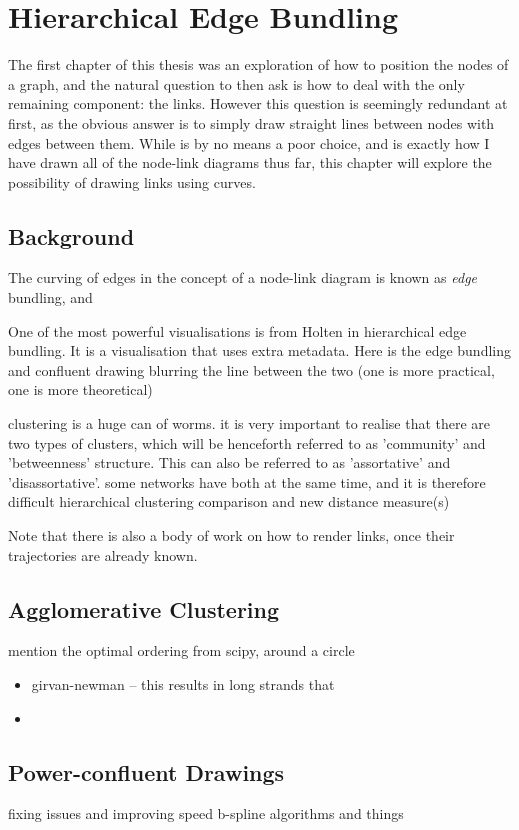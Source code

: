 \chapter{Hierarchical Edge Bundling}
The first chapter of this thesis was an exploration of how to position the nodes of a graph, and the natural question to then ask is how to deal with the only remaining component: the links. However this question is seemingly redundant at first, as the obvious answer is to simply draw straight lines between nodes with edges between them. While is by no means a poor choice, and is exactly how I have drawn all of the node-link diagrams thus far, this chapter will explore the possibility of drawing links using curves.

\section{Background}
The curving of edges in the concept of a node-link diagram is known as \textit{edge} bundling, and 

One of the most powerful visualisations is from Holten in hierarchical edge bundling. It is a visualisation that uses extra metadata. Here is the 
edge bundling and confluent drawing
blurring the line between the two (one is more practical, one is more theoretical)

clustering is a huge can of worms.
it is very important to realise that there are two types of clusters, which will be henceforth referred to as 'community' and 'betweenness' structure. This can also be referred to as 'assortative' and 'disassortative'.
some networks have both at the same time, and it is therefore difficult 
hierarchical clustering comparison and new distance measure(s)

Note that there is also a body of work on how to render links, once their trajectories are already known.

\section{Agglomerative Clustering}

mention the optimal ordering from scipy, around a circle

\begin{itemize}
    \item girvan-newman -- this results in long strands that \item
\end{itemize}

\section{Power-confluent Drawings}
fixing issues and improving speed
b-spline algorithms and things